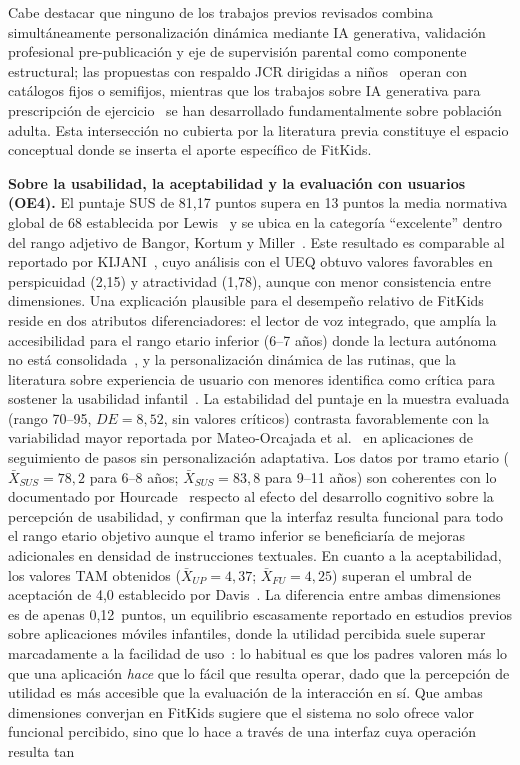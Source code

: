 			Cabe destacar que ninguno de los trabajos previos revisados combina simultáneamente personalización dinámica mediante IA generativa, validación profesional pre-publicación y eje de supervisión parental como componente estructural; las propuestas con respaldo JCR dirigidas a niños~\cite{Zhang2024,Papastergiou2021,Willinger2024,MateoOrcajada2024,GomezCuesta2024} operan con catálogos fijos o semifijos, mientras que los trabajos sobre IA generativa para prescripción de ejercicio~\cite{Zaleski2026,Dergaa2024} se han desarrollado fundamentalmente sobre población adulta. Esta intersección no cubierta por la literatura previa constituye el espacio conceptual donde se inserta el aporte específico de FitKids.
			
			\textbf{Sobre la usabilidad, la aceptabilidad y la evaluación con usuarios (OE4).} El puntaje SUS de 81,17 puntos supera en 13 puntos la media normativa global de 68 establecida por Lewis~\cite{Lewis2018} y se ubica en la categoría ``excelente'' dentro del rango adjetivo de Bangor, Kortum y Miller~\cite{Bangor2008}. Este resultado es comparable al reportado por KIJANI~\cite{Willinger2024}, cuyo análisis con el UEQ obtuvo valores favorables en perspicuidad (2,15) y atractividad (1,78), aunque con menor consistencia entre dimensiones. Una explicación plausible para el desempeño relativo de FitKids reside en dos atributos diferenciadores: el lector de voz integrado, que amplía la accesibilidad para el rango etario inferior (6--7 años) donde la lectura autónoma no está consolidada~\cite{Hourcade2015}, y la personalización dinámica de las rutinas, que la literatura sobre experiencia de usuario con menores identifica como crítica para sostener la usabilidad infantil~\cite{Putnam2020}. La estabilidad del puntaje en la muestra evaluada (rango 70--95, $DE = 8{,}52$, sin valores críticos) contrasta favorablemente con la variabilidad mayor reportada por Mateo-Orcajada et al.~\cite{MateoOrcajada2024} en aplicaciones de seguimiento de pasos sin personalización adaptativa. Los datos por tramo etario ($\bar{X}_{SUS} = 78{,}2$ para 6--8 años; $\bar{X}_{SUS} = 83{,}8$ para 9--11 años) son coherentes con lo documentado por Hourcade~\cite{Hourcade2015} respecto al efecto del desarrollo cognitivo sobre la percepción de usabilidad, y confirman que la interfaz resulta funcional para todo el rango etario objetivo aunque el tramo inferior se beneficiaría de mejoras adicionales en densidad de instrucciones textuales. En cuanto a la aceptabilidad, los valores TAM obtenidos ($\bar{X}_{UP} = 4{,}37$; $\bar{X}_{FU} = 4{,}25$) superan el umbral de aceptación de 4,0 establecido por Davis~\cite{Davis1989}. La diferencia entre ambas dimensiones es de apenas 0,12~puntos, un equilibrio escasamente reportado en estudios previos sobre aplicaciones móviles infantiles, donde la utilidad percibida suele superar marcadamente a la facilidad de uso~\cite{Venkatesh2003}: lo habitual es que los padres valoren más lo que una aplicación \emph{hace} que lo fácil que resulta operar, dado que la percepción de utilidad es más accesible que la evaluación de la interacción en sí. Que ambas dimensiones converjan en FitKids sugiere que el sistema no solo ofrece valor funcional percibido, sino que lo hace a través de una interfaz cuya operación resulta tan 